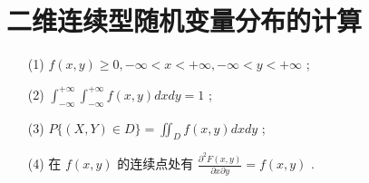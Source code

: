 \documentclass[12pt, a4paper, oneside, UTF8]{ctexbook}
\begin{document}
\section{二维连续型随机变量分布的计算}

\begin{remark}[联合概率密度的性质]
\begin{enumerate}
    \item [(1)] $f\left( {x,y}\right)  \geq  0, - \infty  < x <  + \infty , - \infty  < y <  + \infty$ ;
    \item [(2)] ${\int }_{-\infty }^{+\infty }{\int }_{-\infty }^{+\infty }f\left( {x,y}\right) {dxdy} = 1$ ;
    \item [(3)] $P\{ \left( {X,Y}\right)  \in  D\}  = {\iint }_{D}f\left( {x,y}\right) {dxdy}$ ;
    \item [(4)]在 $f\left( {x,y}\right)$ 的连续点处有 $\frac{{\partial }^{2}F\left( {x,y}\right) }{\partial x\partial y} = f\left( {x,y}\right)$ .
\end{enumerate}
\end{remark}
\end{document}
